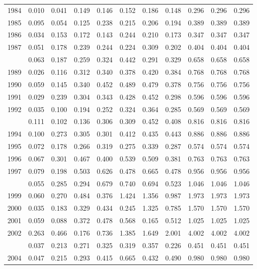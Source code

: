 \documentclass[
]{article}
\begin{document}
\begin{longtable}[t]{lrrrrrrrrrr}
1984 & 0.010 & 0.041 & 0.149 & 0.146 & 0.152 & 0.186 & 0.148 & 0.296 & 0.296 & 0.296\\
1985 & 0.095 & 0.054 & 0.125 & 0.238 & 0.215 & 0.206 & 0.194 & 0.389 & 0.389 & 0.389\\
1986 & 0.034 & 0.153 & 0.172 & 0.143 & 0.244 & 0.210 & 0.173 & 0.347 & 0.347 & 0.347\\
1987 & 0.051 & 0.178 & 0.239 & 0.244 & 0.224 & 0.309 & 0.202 & 0.404 & 0.404 & 0.404\\
\addlinespace
1988 & 0.063 & 0.187 & 0.259 & 0.324 & 0.442 & 0.291 & 0.329 & 0.658 & 0.658 & 0.658\\
1989 & 0.026 & 0.116 & 0.312 & 0.340 & 0.378 & 0.420 & 0.384 & 0.768 & 0.768 & 0.768\\
1990 & 0.059 & 0.145 & 0.340 & 0.452 & 0.489 & 0.479 & 0.378 & 0.756 & 0.756 & 0.756\\
1991 & 0.029 & 0.239 & 0.304 & 0.343 & 0.428 & 0.452 & 0.298 & 0.596 & 0.596 & 0.596\\
1992 & 0.035 & 0.100 & 0.194 & 0.252 & 0.324 & 0.364 & 0.285 & 0.569 & 0.569 & 0.569\\
\addlinespace
1993 & 0.111 & 0.102 & 0.136 & 0.306 & 0.309 & 0.452 & 0.408 & 0.816 & 0.816 & 0.816\\
1994 & 0.100 & 0.273 & 0.305 & 0.301 & 0.412 & 0.435 & 0.443 & 0.886 & 0.886 & 0.886\\
1995 & 0.072 & 0.178 & 0.266 & 0.319 & 0.275 & 0.339 & 0.287 & 0.574 & 0.574 & 0.574\\
1996 & 0.067 & 0.301 & 0.467 & 0.400 & 0.539 & 0.509 & 0.381 & 0.763 & 0.763 & 0.763\\
1997 & 0.079 & 0.198 & 0.503 & 0.626 & 0.478 & 0.665 & 0.478 & 0.956 & 0.956 & 0.956\\
\addlinespace
1998 & 0.055 & 0.285 & 0.294 & 0.679 & 0.740 & 0.694 & 0.523 & 1.046 & 1.046 & 1.046\\
1999 & 0.060 & 0.270 & 0.484 & 0.376 & 1.424 & 1.356 & 0.987 & 1.973 & 1.973 & 1.973\\
2000 & 0.035 & 0.183 & 0.329 & 0.434 & 0.245 & 1.325 & 0.785 & 1.570 & 1.570 & 1.570\\
2001 & 0.059 & 0.088 & 0.372 & 0.478 & 0.568 & 0.165 & 0.512 & 1.025 & 1.025 & 1.025\\
2002 & 0.263 & 0.466 & 0.176 & 0.736 & 1.385 & 1.649 & 2.001 & 4.002 & 4.002 & 4.002\\
\addlinespace
2003 & 0.037 & 0.213 & 0.271 & 0.325 & 0.319 & 0.357 & 0.226 & 0.451 & 0.451 & 0.451\\
2004 & 0.047 & 0.215 & 0.293 & 0.415 & 0.665 & 0.432 & 0.490 & 0.980 & 0.980 & 0.980\\

\end{longtable}
\end{document}

